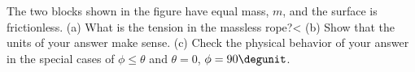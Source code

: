         The two blocks shown in the figure have equal mass, $m$, and the
        surface is frictionless. (a) What is the tension in the massless rope?<%
        (b) Show that the units of your answer make sense.\hwendpart
        (c) Check the physical behavior of your answer in the special cases of
        $\phi \le \theta$ and $\theta=0$, $\phi=90\degunit$.
